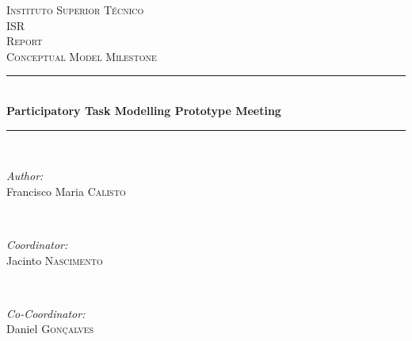 \begin{titlepage}

\newcommand{\HRule}{\rule{\linewidth}{0.5mm}} %

\center %
 

\textsc{\LARGE Instituto Superior T\'{e}cnico}\\[1.5cm]
\textsc{\Large ISR}\\[0.5cm]
\textsc{\large Report}\\[0.25cm]
\textsc{\small Conceptual Model Milestone}\\[0.25cm]


\HRule \\[0.5cm]
{ \large \bfseries  Participatory Task Modelling Prototype Meeting}\\[0.25cm] %
\HRule \\[0.5cm]
 

\begin{minipage}{0.4\textwidth}
\begin{flushleft} \large
\emph{Author:}\\
Francisco Maria \textsc{Calisto} %
\end{flushleft}
\end{minipage}
~
\begin{minipage}{0.4\textwidth}
\begin{flushright} \large
\emph{Coordinator:} \\
Jacinto \textsc{Nascimento} %
\end{flushright}
~
\begin{flushright} \large
\emph{Co-Coordinator:} \\
Daniel \textsc{Gon\c{c}alves} %
\end{flushright}
\end{minipage}\\[2cm]


\end{titlepage}
